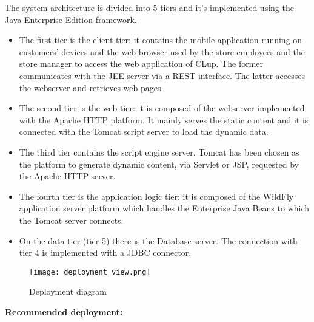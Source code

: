 The system architecture is divided into 5 tiers and it's implemented using the Java Enterprise Edition framework.
\begin{itemize}
    \item The first tier is the client tier: it contains the mobile application running on customers' devices and the web browser used by the store employees and the store manager to access the web application of CLup. The former communicates with the JEE server via a REST interface. The latter accesses the webserver and retrieves web pages.
    \item The second tier is the web tier: it is composed of the webserver implemented with the Apache HTTP platform. It mainly serves the static content and it is connected with the Tomcat script server to load the dynamic data.
    \item The third tier contains the script engine server. Tomcat has been chosen as the platform to generate dynamic content, via Servlet or JSP, requested by the Apache HTTP server.
    \item The fourth tier is the application logic tier: it is composed of the WildFly application server platform which handles the Enterprise Java Beans to which the Tomcat server connects.
    \item On the data tier (tier 5) there is the Database server. The connection with tier 4 is implemented with a JDBC connector.
\end{itemize}

\begin{figure}[H]
    \centering
    \texttt{[image: deployment\_view.png]}
    \caption{Deployment diagram}
\end{figure} 

\textbf{Recommended deployment:}

